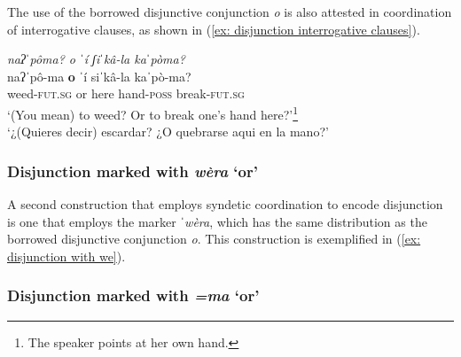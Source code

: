 The use of the borrowed  disjunctive conjunction \textit{o} is also attested in coordination of interrogative clauses, as shown in (\ref{ex: disjunction interrogative clauses}).

\ea\label{ex: disjunction interrogative clauses}

    \textit{naʔˈpôma? o ˈí ʃiˈkâ-la kaˈpòma?}\\
    \gll    naʔˈpô-ma \textbf{o} ˈí siˈkâ-la kaˈpò-ma?\\
            weed-\textsc{fut.sg} or here hand-\textsc{poss} break-\textsc{fut.sg}\\
    \glt    `(You mean) to weed? Or to break one's hand here?'\footnote{The speaker points at her own hand.}\\
    \glt    `¿(Quieres decir) escardar? ¿O quebrarse aqui en la mano?'    \\

\z

\subsubsection{Disjunction marked with \textit{wèra} `or'}
\label{subsubsec: disjunction with we}

A second construction that employs syndetic coordination to encode disjunction is one that employs the marker \textit{ˈwèra}, which has the same distribution as the borrowed disjunctive conjunction \textit{o}. This construction is exemplified in (\ref{ex: disjunction with we}).


\ea\label{ex: disjunction with we}

    \z
\z

\subsubsection{Disjunction marked with \textit{=ma} `or'}
\label{subsubsec: disjunction with ma}

